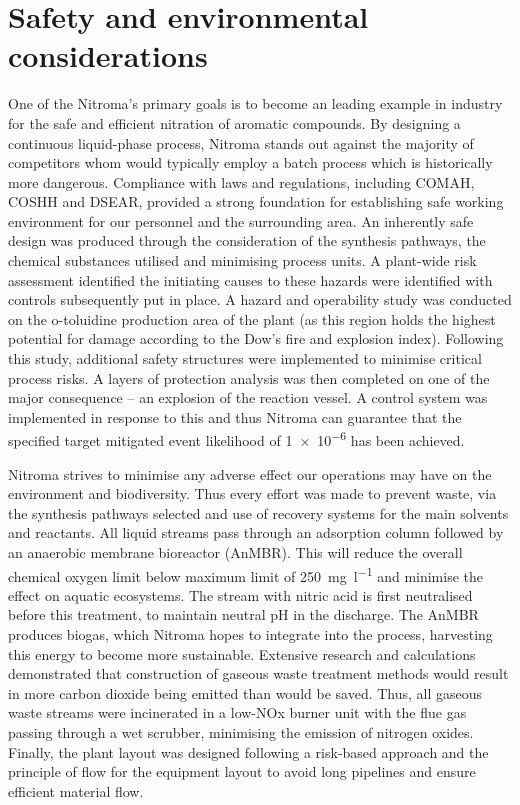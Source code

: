 \section*{Safety and environmental considerations}

 One of the Nitroma's primary goals is to become an leading example in industry for the safe and efficient nitration of aromatic compounds. By designing a continuous liquid-phase process, Nitroma stands out against the majority of competitors whom would typically employ a batch process which is historically more dangerous. Compliance with laws and regulations, including COMAH, COSHH and DSEAR, provided a strong foundation for establishing safe working environment for our personnel and the surrounding area. An inherently safe design was produced through the consideration of the synthesis pathways, the chemical substances utilised and minimising process units. A plant-wide risk assessment identified  the initiating causes to these hazards were identified with controls subsequently put in place. A hazard and operability study was conducted on the o-toluidine production area of the plant (as this region holds the highest potential for damage according to the Dow's fire and explosion index). Following this study, additional safety structures were implemented to minimise critical process risks. A layers of protection analysis was then completed on one of the major consequence – an explosion of the reaction vessel. A control system was implemented in response to this and thus Nitroma can guarantee that the specified target mitigated event likelihood of \num{1e-6} has been achieved.

Nitroma strives to minimise any adverse effect our operations may have on the environment and biodiversity. Thus every effort was made to prevent waste, via the synthesis pathways selected and use of recovery systems for the main solvents and reactants. All liquid streams pass through an adsorption column followed by an anaerobic membrane bioreactor (AnMBR). This will reduce the overall chemical oxygen limit below maximum limit of \SI{250}{\mg\per\litre} and minimise the effect on aquatic ecosystems. The stream with nitric acid is first neutralised before this treatment, to maintain neutral pH in the discharge. The AnMBR produces biogas, which Nitroma hopes to integrate into the process, harvesting this energy to become more sustainable.  Extensive research and calculations demonstrated that construction of gaseous waste treatment methods would result in more carbon dioxide being emitted than would be saved. Thus, all gaseous waste streams were incinerated in a low-NOx burner unit with the flue gas passing through a wet scrubber, minimising the emission of nitrogen oxides. Finally, the plant layout was designed following a risk-based approach and the principle of flow for the equipment layout to avoid long pipelines and ensure efficient material flow. 